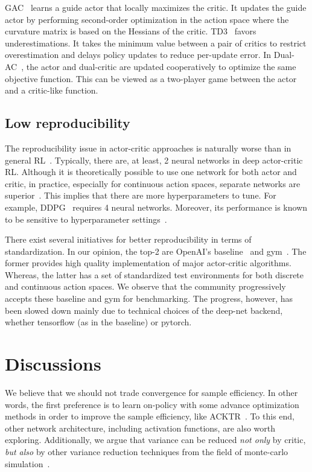 GAC~\cite{tangkaratt2018guide} learns a guide actor that locally maximizes the critic.
It updates the guide actor by performing second-order optimization in
the action space where the curvature matrix is based on the Hessians of the critic.
TD3~\cite{abs-1802-09477} favors underestimations.
It takes the minimum value between a pair of critics to restrict overestimation and
delays policy updates to reduce per-update error.
In Dual-AC~\cite{dai2018boosting}, the actor and dual-critic are updated cooperatively to
optimize the same objective function.
This can be viewed as a two-player game between the actor and a critic-like function.

\subsection{Low reproducibility}
The reproducibility issue in actor-critic approaches is naturally worse than in general RL~\cite{henderson2017reinforcement}.
Typically, there are, at least, 2 neural networks in deep actor-critic RL.
Although it is theoretically possible to use one network for both actor and critic,
in practice, especially for continuous action spaces, separate networks are superior~\cite{pmlr-v48-mniha16}.
This implies that there are more hyperparameters to tune.
For example, DDPG~\cite{LillicrapHPHETS15} requires 4 neural networks.
Moreover, its performance is known to be sensitive to hyperparameter settings~\cite{Duan:2016}.

There exist several initiatives for better reproducibility in terms of standardization.
In our opinion, the top-2 are OpenAI's baseline~\cite{baselines} and gym~\cite{1606.01540}.
The former provides high quality implementation of major actor-critic algorithms.
Whereas, the latter has a set of standardized test environments for both discrete and continuous action spaces.
We observe that the community progressively accepts these baseline and gym for benchmarking.
The progress, however, has been slowed down mainly due to technical choices of the deep-net backend,
whether tensorflow (as in the baseline) or pytorch.

\section{Discussions}
We believe that we should not trade convergence for sample efficiency.
In other words, the first preference is to learn on-policy with some advance optimization methods
in order to improve the sample efficiency, like ACKTR~\cite{NIPS2017_7112}.
To this end, other network architecture, including activation functions, are also worth exploring.
Additionally, we argue that variance can be reduced \emph{not only} by critic,
\emph{but also} by other variance reduction techniques from the field of monte-carlo simulation~\cite{citeulike:14544227}.

